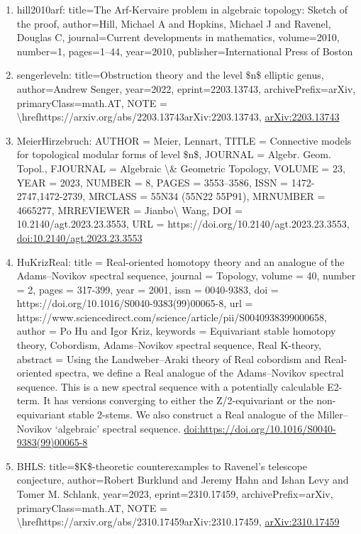 \documentclass[11pt]{article}
\begin{document}
\begin{enumerate}[leftmargin=*]
  \item hill2010arf: title=The Arf-Kervaire problem in algebraic topology: Sketch of the proof, author=Hill, Michael A and Hopkins, Michael J and Ravenel, Douglas C, journal=Current developments in mathematics, volume=2010, number=1, pages=1--44, year=2010, publisher=International Press of Boston
  \item sengerleveln: title=Obstruction theory and the level \$n\$ elliptic genus, author=Andrew Senger, year=2022, eprint=2203.13743, archivePrefix=arXiv, primaryClass=math.AT, NOTE = \textbackslash{}hrefhttps://arxiv.org/abs/2203.13743arXiv:2203.13743, \href{https://arxiv.org/abs/2203.13743}{arXiv:2203.13743}
  \item MeierHirzebruch: AUTHOR = Meier, Lennart, TITLE = Connective models for topological modular forms of level \$n\$, JOURNAL = Algebr. Geom. Topol., FJOURNAL = Algebraic \textbackslash{}\& Geometric Topology, VOLUME = 23, YEAR = 2023, NUMBER = 8, PAGES = 3553--3586, ISSN = 1472-2747,1472-2739, MRCLASS = 55N34 (55N22 55P91), MRNUMBER = 4665277, MRREVIEWER = Jianbo\textbackslash{} Wang, DOI = 10.2140/agt.2023.23.3553, URL = https://doi.org/10.2140/agt.2023.23.3553, \href{https://doi.org/10.2140/agt.2023.23.3553}{doi:10.2140/agt.2023.23.3553}
  \item HuKrizReal: title = Real-oriented homotopy theory and an analogue of the Adams--Novikov spectral sequence, journal = Topology, volume = 40, number = 2, pages = 317-399, year = 2001, issn = 0040-9383, doi = https://doi.org/10.1016/S0040-9383(99)00065-8, url = https://www.sciencedirect.com/science/article/pii/S0040938399000658, author = Po Hu and Igor Kriz, keywords = Equivariant stable homotopy theory, Cobordism, Adams--Novikov spectral sequence, Real K-theory, abstract = Using the Landweber--Araki theory of Real cobordism and Real-oriented spectra, we define a Real analogue of the Adams--Novikov spectral sequence. This is a new spectral sequence with a potentially calculable E2-term. It has versions converging to either the Z/2-equivariant or the non-equivariant stable 2-stems. We also construct a Real analogue of the Miller--Novikov ‘algebraic’ spectral sequence. \href{https://doi.org/https://doi.org/10.1016/S0040-9383(99)00065-8}{doi:https://doi.org/10.1016/S0040-9383(99)00065-8}
  \item BHLS: title=\$K\$-theoretic counterexamples to Ravenel's telescope conjecture, author=Robert Burklund and Jeremy Hahn and Ishan Levy and Tomer M. Schlank, year=2023, eprint=2310.17459, archivePrefix=arXiv, primaryClass=math.AT, NOTE = \textbackslash{}hrefhttps://arxiv.org/abs/2310.17459arXiv:2310.17459, \href{https://arxiv.org/abs/2310.17459}{arXiv:2310.17459}

\end{enumerate}
\end{document}
